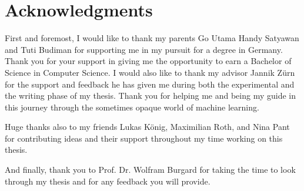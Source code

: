 \chapter{Acknowledgments}

First and foremost, I would like to thank my parents Go Utama Handy Satyawan and Tuti Budiman for supporting me in my pursuit for a degree in Germany. Thank you for your support in giving me the opportunity to earn a Bachelor of Science in Computer Science.
I would also like to thank my advisor Jannik Zürn for the support and feedback he has given me during both the experimental and the writing phase of my thesis.
Thank you for helping me and being my guide in this journey through the sometimes opaque world of machine learning.

Huge thanks also to my friends Lukas König, Maximilian Roth, and Nina Pant for contributing ideas and their support throughout my time working on this thesis.

And finally, thank you to Prof. Dr. Wolfram Burgard for taking the time to look through my thesis and for any feedback you will provide.